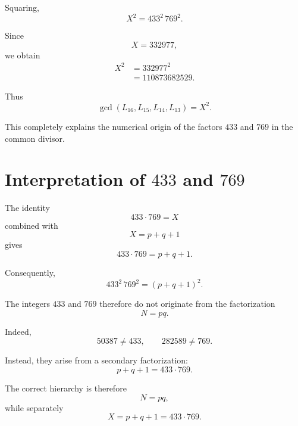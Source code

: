 \documentclass[11pt,a4paper]{article}
\theoremstyle{definition}
\theoremstyle{remark}
\newcommand{\gcdx}{\operatorname{gcd}}
\begin{document}
Squaring,
\begin{equation}
X^2
=
433^2\,769^2.
\end{equation}

Since
\[
X=332977,
\]
we obtain
\begin{align}
X^2
&=332977^2\\
&=110873682529.
\end{align}

Thus
\begin{equation}
\boxed{
\gcdx(L_{16},L_{15},L_{14},L_{13})
=
X^2.
}
\end{equation}

This completely explains the numerical origin of the factors $433$ and
$769$ in the common divisor.

\section{Interpretation of $433$ and $769$}

The identity
\begin{equation}
433\cdot769=X
\end{equation}
combined with
\begin{equation}
X=p+q+1
\end{equation}
gives
\begin{equation}
\boxed{
433\cdot769=p+q+1.
}
\end{equation}

Consequently,
\begin{equation}
433^2\,769^2=(p+q+1)^2.
\end{equation}

The integers $433$ and $769$ therefore do not originate from the
factorization
\[
N=pq.
\]

Indeed,
\[
50387\neq433,\qquad
282589\neq769.
\]

Instead, they arise from a secondary factorization:
\begin{equation}
\boxed{
p+q+1=433\cdot769.
}
\end{equation}

The correct hierarchy is therefore
\begin{equation}
N=pq,
\end{equation}
while separately
\begin{equation}
X=p+q+1=433\cdot769.
\end{equation}
\end{document}
